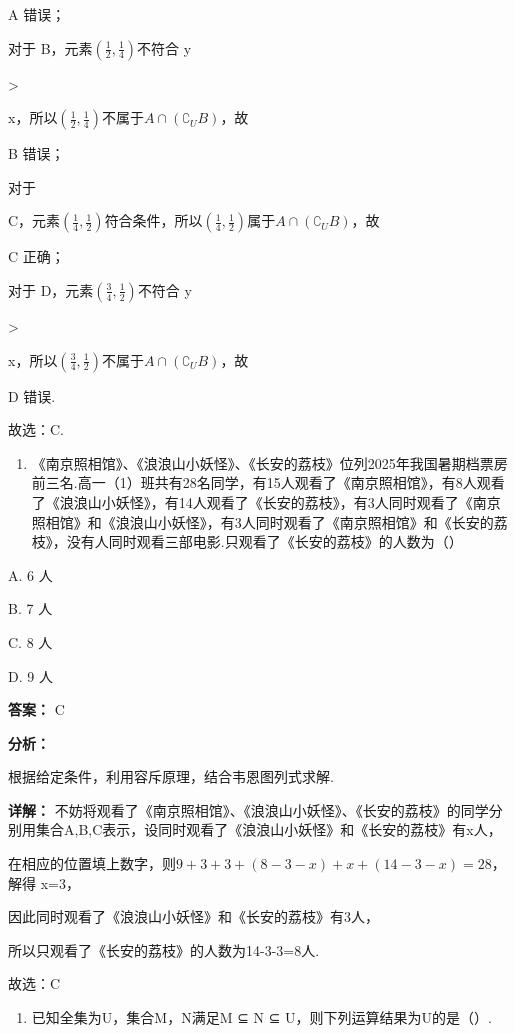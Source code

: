 \documentclass[11pt,a4paper]{ctexart}
\begin{document}
A 错误；

对于 B，元素\(\left(\frac{1}{2},\frac{1}{4}\right)\)不符合 y

\textgreater{}

x，所以\(\left(\frac{1}{2},\frac{1}{4}\right)\)不属于\(A\cap(\complement_U B)\)，故

B 错误；

对于

C，元素\(\left(\frac{1}{4},\frac{1}{2}\right)\)符合条件，所以\(\left(\frac{1}{4},\frac{1}{2}\right)\)属于\(A\cap(\complement_U B)\)，故

C 正确；

对于 D，元素\(\left(\frac{3}{4},\frac{1}{2}\right)\)不符合 y

\textgreater{}

x，所以\(\left(\frac{3}{4},\frac{1}{2}\right)\)不属于\(A\cap(\complement_U B)\)，故

D 错误.

故选：C.

\begin{enumerate}[label=\arabic*., leftmargin=*, start=11]
\item 《南京照相馆》、《浪浪山小妖怪》、《长安的荔枝》位列2025年我国暑期档票房前三名.高一（1）班共有28名同学，有15人观看了《南京照相馆》，有8人观看了《浪浪山小妖怪》，有14人观看了《长安的荔枝》，有3人同时观看了《南京照相馆》和《浪浪山小妖怪》，有3人同时观看了《南京照相馆》和《长安的荔枝》，没有人同时观看三部电影.只观看了《长安的荔枝》的人数为（）
\end{enumerate}

A. 6 人

B. 7 人

C. 8 人

D. 9 人

\textbf{答案：}
C

\textbf{分析：}

根据给定条件，利用容斥原理，结合韦恩图列式求解.

\textbf{详解：}
不妨将观看了《南京照相馆》、《浪浪山小妖怪》、《长安的荔枝》的同学分别用集合A,B,C表示，设同时观看了《浪浪山小妖怪》和《长安的荔枝》有x人，

在相应的位置填上数字，则\(9+3+3+(8-3-x)+x+(14-3-x)=28\)，解得 x=3，

因此同时观看了《浪浪山小妖怪》和《长安的荔枝》有3人，

所以只观看了《长安的荔枝》的人数为14-3-3=8人.

故选：C

\begin{enumerate}[label=\arabic*., leftmargin=*, start=12]
\item 已知全集为U，集合M，N满足M ⊆ N ⊆ U，则下列运算结果为U的是（）.
\end{enumerate}
\end{document}
